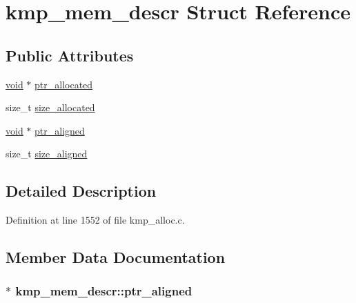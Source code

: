 \hypertarget{structkmp__mem__descr}{\section{kmp\-\_\-mem\-\_\-descr Struct Reference}
\label{structkmp__mem__descr}
}
\subsection*{Public Attributes}
\begin{DoxyCompactItemize}
\item 
\hyperlink{ittnotify__static_8h_af941d56e55e3c5465135b60c4d6343ed}{void} $\ast$ \hyperlink{structkmp__mem__descr_ad2113fb51705dca6a3f4b35a7842b1e6}{ptr\-\_\-allocated}
\item 
size\-\_\-t \hyperlink{structkmp__mem__descr_adaf988fb85d121839a32ce016312ba34}{size\-\_\-allocated}
\item 
\hyperlink{ittnotify__static_8h_af941d56e55e3c5465135b60c4d6343ed}{void} $\ast$ \hyperlink{structkmp__mem__descr_a0db8f2651ee81d991e488b017a09ad31}{ptr\-\_\-aligned}
\item 
size\-\_\-t \hyperlink{structkmp__mem__descr_a6050e2806a19c46a0df4418f4df57f9d}{size\-\_\-aligned}
\end{DoxyCompactItemize}


\subsection{Detailed Description}


Definition at line 1552 of file kmp\-\_\-alloc.\-c.



\subsection{Member Data Documentation}
\hypertarget{structkmp__mem__descr_a0db8f2651ee81d991e488b017a09ad31}{
\subsubsection[{ptr\-\_\-aligned}]{$\ast$ kmp\-\_\-mem\-\_\-descr\-::ptr\-\_\-aligned}}\label{structkmp__mem__descr_a0db8f2651ee81d991e488b017a09ad31}


